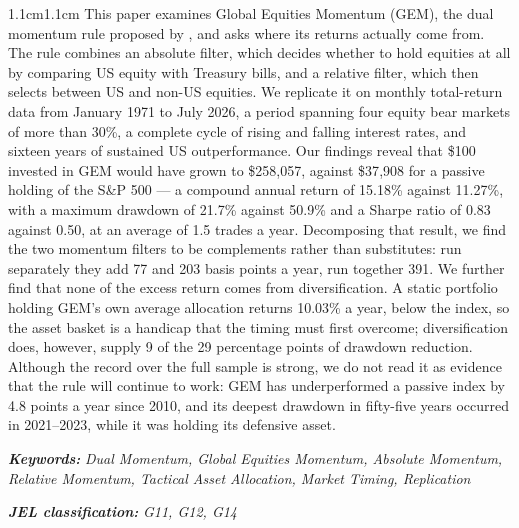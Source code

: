 \documentclass[11pt,a4paper]{article}
\begin{document}
\begin{adjustwidth}{1.1cm}{1.1cm}
\noindent
This paper examines Global Equities Momentum (GEM), the dual momentum rule
proposed by \citet{antonacci2016}, and asks where its returns actually come
from. The rule combines an absolute filter, which decides whether to hold
equities at all by comparing US equity with Treasury bills, and a relative
filter, which then selects between US and non-US equities. We replicate it on
monthly total-return data from January 1971 to July 2026, a period spanning
four equity bear markets of more than 30\%, a complete cycle of rising and
falling interest rates, and sixteen years of sustained US outperformance. Our
findings reveal that \$100 invested in GEM would have grown to \$258{,}057,
against \$37{,}908 for a passive holding of the S\&P 500 --- a compound annual
return of 15.18\% against 11.27\%, with a maximum drawdown of 21.7\% against
50.9\% and a Sharpe ratio of 0.83 against 0.50, at an average of 1.5 trades a
year. Decomposing that result, we find the two momentum filters to be
complements rather than substitutes: run separately they add 77 and 203 basis
points a year, run together 391. We further find that none of the excess return
comes from diversification. A static portfolio holding GEM's own average
allocation returns 10.03\% a year, below the index, so the asset basket is a
handicap that the timing must first overcome; diversification does, however,
supply 9 of the 29 percentage points of drawdown reduction. Although the record
over the full sample is strong, we do not read it as evidence that the rule
will continue to work: GEM has underperformed a passive index by 4.8 points a
year since 2010, and its deepest drawdown in fifty-five years occurred in
2021--2023, while it was holding its defensive asset.

\vspace{1.0em}
\noindent\footnotesize\textbf{\textit{Keywords:}} \textit{Dual Momentum, Global
Equities Momentum, Absolute Momentum, Relative Momentum, Tactical Asset
Allocation, Market Timing, Replication}

\vspace{0.35em}
\noindent\footnotesize\textbf{\textit{JEL classification:}} \textit{G11, G12,
G14}
\end{adjustwidth}

\end{document}
